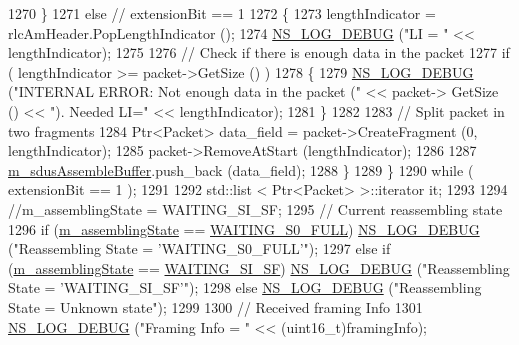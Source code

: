\begin{DoxyCode}
1270         \}
1271       \textcolor{keywordflow}{else} \textcolor{comment}{// extensionBit == 1}
1272         \{
1273           lengthIndicator = rlcAmHeader.PopLengthIndicator ();
1274           \hyperlink{group__logging_ga413f1886406d49f59a6a0a89b77b4d0a}{NS\_LOG\_DEBUG} (\textcolor{stringliteral}{"LI = "} << lengthIndicator);
1275 
1276           \textcolor{comment}{// Check if there is enough data in the packet}
1277           \textcolor{keywordflow}{if} ( lengthIndicator >= packet->GetSize () )
1278             \{
1279               \hyperlink{group__logging_ga413f1886406d49f59a6a0a89b77b4d0a}{NS\_LOG\_DEBUG} (\textcolor{stringliteral}{"INTERNAL ERROR: Not enough data in the packet ("} << packet->
      GetSize () << \textcolor{stringliteral}{"). Needed LI="} << lengthIndicator);
1281             \}
1282 
1283           \textcolor{comment}{// Split packet in two fragments}
1284           Ptr<Packet> data\_field = packet->CreateFragment (0, lengthIndicator);
1285           packet->RemoveAtStart (lengthIndicator);
1286 
1287           \hyperlink{classns3_1_1LteRlcAm_a075262ee7d8d49e97ab0c48b5e763bf1}{m\_sdusAssembleBuffer}.push\_back (data\_field);
1288         \}
1289     \}
1290   \textcolor{keywordflow}{while} ( extensionBit == 1 );
1291 
1292   std::list < Ptr<Packet> >::iterator it;
1293   
1294   \textcolor{comment}{//m\_assemblingState = WAITING\_SI\_SF;}
1295   \textcolor{comment}{// Current reassembling state}
1296   \textcolor{keywordflow}{if}      (\hyperlink{classns3_1_1LteRlcAm_ab6d2954b419df60fc8f8df012fa2709c}{m\_assemblingState} == \hyperlink{classns3_1_1LteRlcAm_a43eeebdccf778e2247c956481ed03d62a832e01ad620b816d8bc1fe1b3fea8708}{WAITING\_S0\_FULL})  
      \hyperlink{group__logging_ga413f1886406d49f59a6a0a89b77b4d0a}{NS\_LOG\_DEBUG} (\textcolor{stringliteral}{"Reassembling State = 'WAITING\_S0\_FULL'"});
1297   \textcolor{keywordflow}{else} \textcolor{keywordflow}{if} (\hyperlink{classns3_1_1LteRlcAm_ab6d2954b419df60fc8f8df012fa2709c}{m\_assemblingState} == \hyperlink{classns3_1_1LteRlcAm_a43eeebdccf778e2247c956481ed03d62a967f9c81a213f824b6a908bdfc1a7e4e}{WAITING\_SI\_SF})    
      \hyperlink{group__logging_ga413f1886406d49f59a6a0a89b77b4d0a}{NS\_LOG\_DEBUG} (\textcolor{stringliteral}{"Reassembling State = 'WAITING\_SI\_SF'"});
1298   \textcolor{keywordflow}{else}                                              \hyperlink{group__logging_ga413f1886406d49f59a6a0a89b77b4d0a}{NS\_LOG\_DEBUG} (\textcolor{stringliteral}{"Reassembling State = Unknown
       state"});
1299 
1300   \textcolor{comment}{// Received framing Info}
1301   \hyperlink{group__logging_ga413f1886406d49f59a6a0a89b77b4d0a}{NS\_LOG\_DEBUG} (\textcolor{stringliteral}{"Framing Info = "} << (uint16\_t)framingInfo);

\end{DoxyCode}
